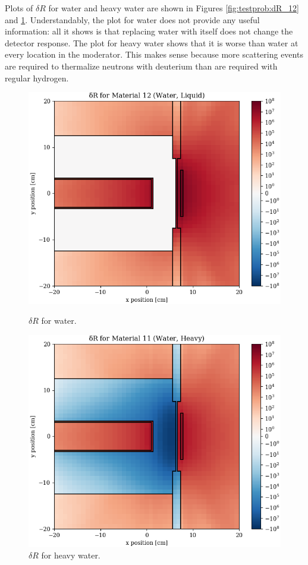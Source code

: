 Plots of $\delta R$ for water and heavy water are shown in Figures \ref{fig:testprob:dR_12} and \ref{fig:testprob:dR_11}.
Understandably, the plot for water does not provide any useful information: all it shows is that replacing water with itself does not change the detector response.
The plot for heavy water shows that it is worse than water at every location in the moderator.
This makes sense because more scattering events are required to thermalize neutrons with deuterium than are required with regular hydrogen.

\begin{figure}
  \begin{minipage}{0.49\linewidth}
    \centering
    \includegraphics[width=\linewidth]{content/testprob/dR_12.png}
    \caption{$\delta R$ for water.}
    \label{fig:testprob:dR_12}
  \end{minipage}
  \hfill
  \begin{minipage}{0.49\linewidth}
    \centering
    \includegraphics[width=\linewidth]{content/testprob/dR_11.png}
    \caption{$\delta R$ for heavy water.}
    \label{fig:testprob:dR_11}
  \end{minipage}
\end{figure}

